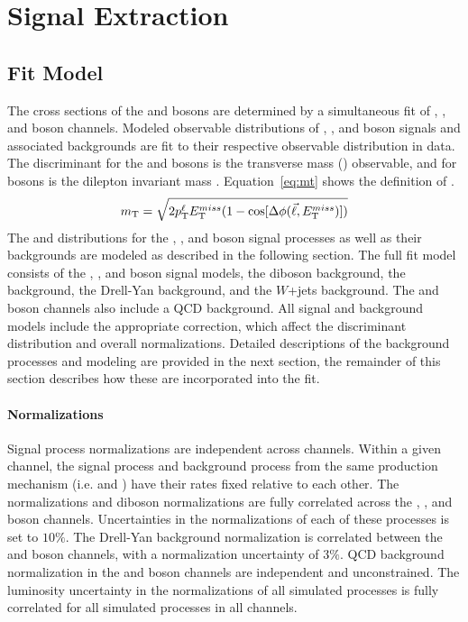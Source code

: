 \chapter{Signal Extraction}\label{ch:sig}
\section{Fit Model}\label{ch:sig:fit}
The cross sections of the \Wpm and \Z bosons are determined by a simultaneous fit of \Wp, \Wm, and \Z boson channels. Modeled observable distributions of \Wp, \Wm, and \Z boson signals and associated backgrounds are fit to their respective observable distribution in data. The discriminant for the \Wp and \Wm bosons is the transverse mass (\mt) observable, and for \Z bosons is the dilepton invariant mass \mll. Equation~\ref{eq:mt} shows the definition of \mt.
\begin{equation}
m_{\mathrm{T}} = \sqrt{ 2 p_{\mathrm{T}}^{\ell} E_{\mathrm{T}}^{miss} ( 1 - \cos[\Delta\phi( {\vec \ell},E_{\mathrm{T}}^{miss} ) ] ) }
\label{eq:mt}
\end{equation}
The \mll and \mt distributions for the \Wp, \Wm, and \Z boson signal processes as well as their backgrounds are modeled as described in the following section. 
The full fit model consists of the \Wp, \Wm, and \Z boson signal models, the diboson background, the \ttbar background, the Drell-Yan background, and the $W$+jets background. The \Wp and \Wm boson channels also include a QCD background. All signal and background models include the appropriate correction, which affect the discriminant distribution and overall normalizations. Detailed descriptions of the background processes and modeling are provided in the next section, the remainder of this section describes how these are incorporated into the  fit. 
\subsubsection{Normalizations}
Signal process normalizations are independent across channels. Within a given channel, the signal process and background process from the same production mechanism (i.e. \wmunu and \wtau) have their rates fixed relative to each other. The \ttbar normalizations and diboson normalizations are fully correlated across the \Wp, \Wm, and \Z boson channels. Uncertainties in the normalizations of each of these processes is set to $10\%$. The Drell-Yan background normalization is correlated between the \Wp and \Wm boson channels, with a normalization uncertainty of $3\%$. QCD background normalization in the \Wp and \Wm boson channels are independent and unconstrained. The luminosity uncertainty in the normalizations of all simulated processes is fully correlated for all simulated processes in all channels. 

